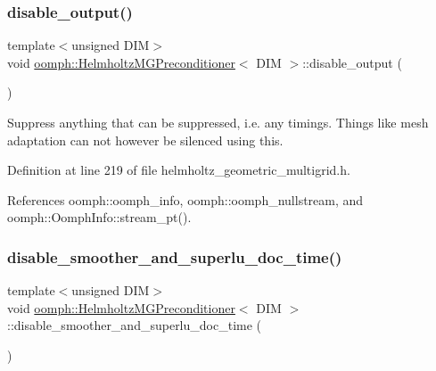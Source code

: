 \mbox{\label{classoomph_1_1HelmholtzMGPreconditioner_a313a399ae5138487c8d45efcfdc72fe3}} 
\subsubsection{\texorpdfstring{disable\+\_\+output()}{disable\_output()}}
{\footnotesize\ttfamily template$<$unsigned D\+IM$>$ \\
void \hyperlink{classoomph_1_1HelmholtzMGPreconditioner}{oomph\+::\+Helmholtz\+M\+G\+Preconditioner}$<$ D\+IM $>$\+::disable\+\_\+output (\begin{DoxyParamCaption}{ }\end{DoxyParamCaption})\hspace{0.3cm}{\ttfamily [inline]}}



Suppress anything that can be suppressed, i.\+e. any timings. Things like mesh adaptation can not however be silenced using this. 



Definition at line 219 of file helmholtz\+\_\+geometric\+\_\+multigrid.\+h.



References oomph\+::oomph\+\_\+info, oomph\+::oomph\+\_\+nullstream, and oomph\+::\+Oomph\+Info\+::stream\+\_\+pt().

\mbox{\label{classoomph_1_1HelmholtzMGPreconditioner_a68e5048a3e62dac7036e36eb1e514b95}} 
\subsubsection{\texorpdfstring{disable\+\_\+smoother\+\_\+and\+\_\+superlu\+\_\+doc\+\_\+time()}{disable\_smoother\_and\_superlu\_doc\_time()}}
{\footnotesize\ttfamily template$<$unsigned D\+IM$>$ \\
void \hyperlink{classoomph_1_1HelmholtzMGPreconditioner}{oomph\+::\+Helmholtz\+M\+G\+Preconditioner}$<$ D\+IM $>$\+::disable\+\_\+smoother\+\_\+and\+\_\+superlu\+\_\+doc\+\_\+time (\begin{DoxyParamCaption}{ }\end{DoxyParamCaption})\hspace{0.3cm}{\ttfamily [inline]}}



